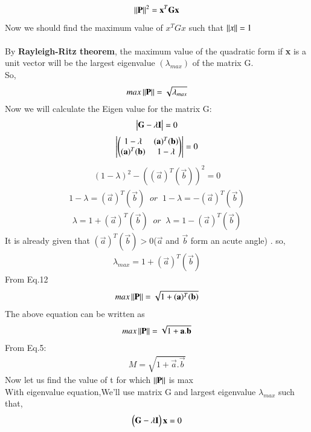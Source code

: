 \documentclass[journal]{IEEEtran}
\theoremstyle{remark}
\begin{document}
\begin{align}
\norm{\Vec{P}}^2=\Vec{x}^T\vec{G}\Vec{x}
  \end{align}
Now we should find the maximum value of \textbf{$x^TGx$} such that $\left\lVert x\right\rVert=1$\\\\
By \textbf{Rayleigh-Ritz theorem}, the maximum value of the quadratic form if \textbf{x} is a unit vector will be the largest eigenvalue $(\lambda_{max})$ of the matrix G.\\
So,
\begin{align}
    max\norm{\Vec{P}}=\sqrt{\lambda_{max}}
\end{align}
Now we will calculate the Eigen value for the matrix G:
\begin{align}
    \mydet{\Vec{G}-\lambda \Vec{I}}=0
\end{align}
\begin{align}
    \mydet{\myvec{1-\lambda&(\Vec{a})^T(\Vec{b})\\(\Vec{a})^T(\Vec{b})&1-\lambda}}=0
\end{align}
\begin{align}
    (1-\lambda)^2-((\Vec{a})^T(\Vec{b}))^2=0
\end{align}
\begin{align}
    1-\lambda=(\Vec{a})^T(\Vec{b})\;\;or\;\;1-\lambda=-(\Vec{a})^T(\Vec{b})
\end{align}
\begin{align}
    \lambda=1+(\Vec{a})^T(\Vec{b})\;\;or \;\;\lambda=1-(\Vec{a})^T(\Vec{b})
\end{align}
It is already given that $(\Vec{a})^T(\Vec{b})>0 $($\Vec{a}$ and $\Vec{b}$ form an acute angle) . so,
\begin{align}
 \lambda_{max}=1+  (\Vec{a})^T(\Vec{b}) 
\end{align}
From Eq.12
\begin{align}
    max\norm{\Vec{P}}=\sqrt{1+  (\Vec{a})^T(\Vec{b}) }
\end{align}
The above equation can be written as
\begin{align}
   max \norm{\Vec{P}}=\sqrt{1+\Vec{a}.\Vec{b}}
\end{align}
From Eq.5:
\begin{align}
    M=\sqrt{1+\Vec{a}.\Vec{b}}
\end{align}
Now let us find the value of t for which $\norm{\Vec{P}}$ is max\\
With eigenvalue equation,We'll use matrix G and largest eigenvalue $\lambda_{max}$ such that,
\begin{align}
    \myvec{\Vec{G}-\lambda \Vec{I}}\Vec{x}=0
\end{align}
\end{document}
